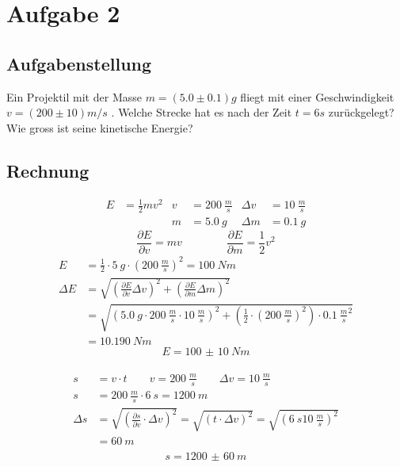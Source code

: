 \section*{Aufgabe 2}
    \subsection*{Aufgabenstellung}
        Ein Projektil mit der Masse $m = (5.0 \pm 0.1)g$ fliegt mit einer Geschwindigkeit\\
        $v = (200 \pm 10)m/s$ . Welche Strecke hat es nach der Zeit $t = 6 s$ zurückgelegt?\\
        Wie gross ist seine kinetische Energie?

    \subsection*{Rechnung}
        \begin{align}
            E &= \frac{1}{2} m v^2 & 
            v &= \SI{200}{\frac{m}{s}} &
            Δv &= \SI{10}{\frac{m}{s}}\\
            & & m &= \SI{5.0}{g} &
            Δm &= \SI{0.1}{g}
        \end{align}
        \begin{equation}
            \frac{∂E}{∂v} = mv \qquad \qquad \frac{∂E}{∂m} = \frac{1}{2} v^2
        \end{equation}
        \begin{align}
            E &= \frac{1}{2} \cdot \SI{5}{g} \cdot (\SI{200}{\frac{m}{s}})^2 = \SI{100}{Nm}\\
            ΔE &= \sqrt{(\frac{∂E}{∂v} Δv)^2 + (\frac{∂E}{∂m} Δm)^2}\\
            &= \sqrt{(\SI{5.0}{g} \cdot \SI{200}{\frac{m}{s}} \cdot \SI{10}{\frac{m}{s}})^2 + (\frac{1}{2} \cdot (\SI{200}{\frac{m}{s}})^2) \cdot \SI{0.1}{\frac{m}{s}}^2}\\
            &= \SI{10,190}{Nm}
        \end{align}
        \begin{equation}
            E = \SI{100(10)}{Nm}
        \end{equation}
        \\
        \begin{align}
            s &= v\cdot t \qquad v = \SI{200}{\frac{m}{s}} \qquad Δv = \SI{10}{\frac{m}{s}}\\
            s &= \SI{200}{\frac{m}{s}} \cdot \SI{6}{s} = \SI{1200}{m}\\
            Δs &= \sqrt{(\frac{∂s}{∂v} \cdot Δv)^2} = \sqrt{(t \cdot Δv)^2} = \sqrt{(\SI{6}{s} \SI{10}{\frac{m}{s}})^2}\\
            &= \SI{60}{m}\\
        \end{align}
        \begin{equation}
            s = \SI{1200(60)}{m}
        \end{equation}
        